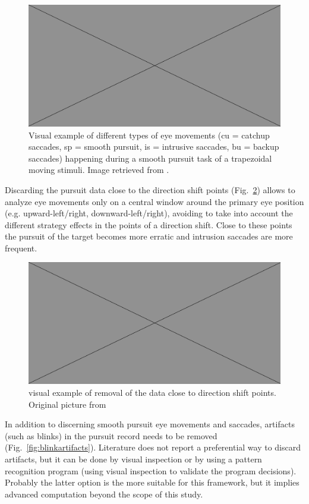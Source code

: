 \begin{figure}[h]
  \centering
  \includegraphics[width=.5\textwidth]{figures/placeholderImg.jpg}
  \caption[Saccades during smooth pursuit]{Visual example of different types of eye movements (cu = catchup saccades, sp = smooth pursuit, is = intrusive saccades, bu = backup saccades) happening during a smooth pursuit task of a trapezoidal moving stimuli. Image retrieved from \cite{randal1993smooth}.}
  \label{fig:intrusivesaccades}
\end{figure}

Discarding the pursuit data close to the direction shift points (Fig.~\ref{fig:dirchange}) allows to analyze eye movements only on a central window around the primary eye position (e.g. upward-left/right, downward-left/right), avoiding to take into account the different strategy effects in the points of a direction shift. Close to these points the pursuit of the target becomes more erratic and intrusion saccades are more frequent.

\begin{figure}[h]
  \centering
  \includegraphics[width=.5\textwidth]{figures/placeholderImg.jpg}
  \caption[Discard data at turning points]{visual example of removal of the data close to direction shift points. Original picture from \cite{vonhofsten1997smoothpursuit}}
  \label{fig:dirchange}
\end{figure}

In addition to discerning smooth pursuit eye movements and saccades, artifacts (such as blinks) in the pursuit record needs to be removed (Fig.~\ref{fig:blinkartifacts}). Literature does not report a preferential way to discard artifacts, but it can be done by visual inspection or by using a pattern recognition program (using visual inspection to validate the program decisions). Probably the latter option is the more suitable for this framework, but it implies advanced computation beyond the scope of this study.

